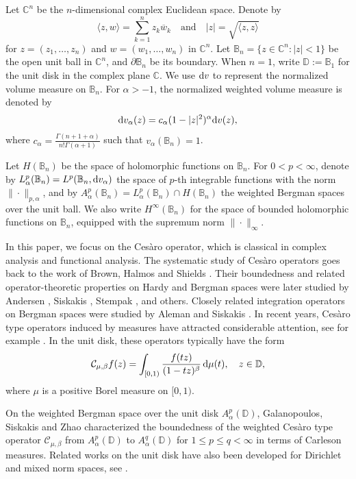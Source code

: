\documentclass[preprint,12pt,times]{elsarticle}
\theoremstyle{definition}
\theoremstyle{remark}
\numberwithin{equation}{section}
\begin{document}
Let $\mathbb C^n$ be the $n$-dimensional complex Euclidean space. Denote by
\[\langle z,w\rangle=\sum\limits_{k=1}^n z_k\overline{ w}_k\quad \text{and}\quad |z|=\sqrt{\langle z,z\rangle}\]  for $z=(z_1,\dots,z_n)$ and $w=(w_1,\dots,w_n)$ in $\mathbb C^n$. 
Let $\mathbb B_n=\{z\in\mathbb C^n:|z|<1\}$ be the open unit ball in $\mathbb C^n$, and $\partial \mathbb B_n$ be its boundary. When $n=1$, write $\mathbb D:=\mathbb{B}_1$ for the unit disk in the complex plane $\mathbb{C}$. We use ${\rm d}v$ to represent the normalized volume measure on $\mathbb B_n$. For $\alpha>-1$, the normalized weighted volume measure is denoted by
\[
{\rm d}v_\alpha(z)=c_\alpha(1-|z|^2)^\alpha {\rm d} v(z),
\]
where $c_{\alpha}=\frac{\Gamma(n+1+\alpha)}{n!\Gamma(\alpha+1)}$ such that $v_\alpha(\mathbb B_n)=1$. 

Let $H(\mathbb B_n)$ be the
space of holomorphic functions on $\mathbb B_n$.
For $0<p<\infty$, denote by
$L_\alpha^p(\mathbb{B}_n)=L^p(\mathbb B_n,{\rm d}v_\alpha)$ the space of $p$-th integrable functions with the norm $\|\cdot\|_{p,\alpha}$, and by
$A_\alpha^p(\mathbb{B}_n)=L_\alpha^p(\mathbb{B}_n)\cap H(\mathbb B_n)$ the weighted Bergman spaces over the unit ball. We also write
$H^\infty(\mathbb B_n)$ for the space of bounded holomorphic functions on
$\mathbb B_n$, equipped with the supremum norm $\|\cdot\|_\infty$.

In this paper, we focus on the Ces\`aro operator, which is classical in complex analysis and functional analysis. The systematic study of Ces\`aro operators goes back to the work of Brown,
Halmos and Shields \cite{BHS1965}. Their boundedness and related
operator-theoretic properties on Hardy and Bergman spaces were later studied
by Andersen \cite{Andersen1996}, Siskakis
\cite{Siskakis1987,Siskakis1990,Siskakis1996}, Stempak
\cite{Stempak1994}, and others.
Closely related integration operators on Bergman spaces were studied by
Aleman and Siskakis \cite{AlemanSiskakis1997}.
In recent years, Ces\`aro type operators induced by measures have
attracted considerable attention, see for example
\cite{BaoSunWulan2022, GGM2022,GalGirMer2023}. In the unit disk, these
operators typically have the form
\[
    \mathcal C_{\mu,\beta} f(z)=\int_{[0,1)} \frac{f(tz)}{(1-tz)^\beta}\,{\rm d}\mu(t),
    \quad z\in\mathbb D,
\]
where $\mu$ is a positive Borel measure on $[0,1)$.

On the weighted Bergman space over the unit disk $A^p_\alpha(\mathbb D)$, Galanopoulos, Siskakis and Zhao
\cite{GSZ2025} characterized the boundedness of the weighted Ces\`aro type operator $\mathcal{C}_{\mu,\beta}$ from $A_{\alpha}^p(\mathbb{D})$ to $A_{\alpha}^q(\mathbb{D})$ for $1\leq p\leq q<\infty$ in terms of Carleson measures.
Related works on the unit disk have also been developed for Dirichlet and mixed norm spaces, see \cite{BlascoMas2025, GalMasMer2023,JinTang2022}.
\end{document}
